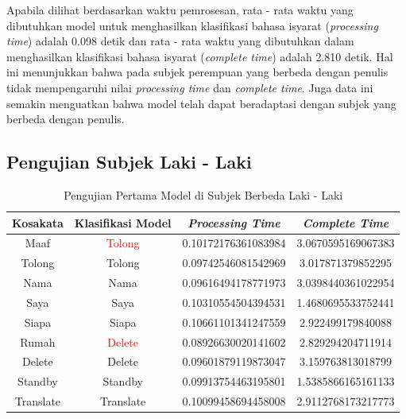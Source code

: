 Apabila dilihat berdasarkan waktu pemrosesan, rata - rata waktu yang dibutuhkan model untuk menghasilkan klasifikasi bahasa isyarat (\emph{processing time}) adalah 0.098 detik dan rata - rata waktu yang dibutuhkan dalam menghasilkan klasifikasi bahasa isyarat (\emph{complete time}) adalah 2.810 detik. Hal ini menunjukkan bahwa pada subjek perempuan yang berbeda dengan penulis tidak mempengaruhi nilai \emph{processing time} dan \emph{complete time}. Juga data ini semakin menguatkan bahwa model telah dapat beradaptasi dengan subjek yang berbeda dengan penulis.  

\subsection{Pengujian Subjek Laki - Laki}
\label{sec:analisislaki}

\begin{longtable}{|c|c|c|c|}
  \caption{Pengujian Pertama Model di Subjek Berbeda Laki - Laki}
  \label{tb:prediksilaki1}                                   \\
  \hline
  \rowcolor[HTML]{C0C0C0}
  \textbf{Kosakata} & \textbf{Klasifikasi Model} & \textbf{\emph{Processing Time}} & \textbf{\emph{Complete Time}}\\
  \hline
  Maaf              & \textcolor{red}{Tolong}                        & 0.10172176361083984                           & 3.0670595169067383                                  \\
  Tolong            & Tolong                        & 0.09742546081542969                           & 3.017871379852295                                  \\
  Nama              & Nama                        & 0.09616494178771973                           & 3.0398440361022954                                  \\
  Saya              & Saya                        & 0.10310554504394531                           & 1.4680695533752441                                  \\
  Siapa              & Siapa                        & 0.10661101341247559                           & 2.922499179840088                                  \\
  Rumah             & \textcolor{red}{Delete}                        & 0.08926630020141602                           & 2.829294204711914                                  \\
  Delete            & Delete                         & 0.09601879119873047                           & 3.159763813018799                                  \\
  Standby           & Standby                        & 0.09913754463195801                            & 1.5385866165161133                                  \\
  Translate         & Translate                        & 0.10099458694458008                           & 2.9112768173217773                                  \\
  \hline
\end{longtable}


